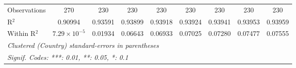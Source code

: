 \begin{table}[htbp]
\begin{tabular}{lcccccccc}
      Observations                                                     & 270                   & 230      & 230            & 230            & 230            & 230            & 230             & 230\\  
      R$^2$                                                            & 0.90994               & 0.93591  & 0.93899        & 0.93918        & 0.93924        & 0.93941        & 0.93953         & 0.93959\\  
      Within R$^2$                                                     & $7.29\times 10^{-5}$  & 0.01934  & 0.06643        & 0.06933        & 0.07025        & 0.07280        & 0.07477         & 0.07555\\  
      \midrule \midrule
      \multicolumn{9}{l}{\emph{Clustered (Country) standard-errors in parentheses}}\\
      \multicolumn{9}{l}{\emph{Signif. Codes: ***: 0.01, **: 0.05, *: 0.1}}\\
   \end{tabular}
\end{table}


